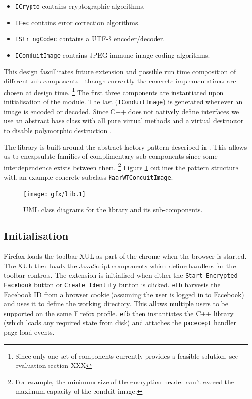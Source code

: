     \begin{itemize}
    
        \item {\tt ICrypto} contains cryptographic algorithms.
        \item {\tt IFec} contains error correction algorithms.
        \item {\tt IStringCodec} contains a UTF-8 encoder/decoder.
        \item {\tt IConduitImage} contains JPEG-immune image coding algorithms.
    
    \end{itemize}
    
    This design fascillitates future extension and possible run time composition of different sub-components - though currently the concrete implementations are chosen at design time. \footnote{Since only one set of components currently provides a feasible solution, see evaluation section XXX} The first three components are instantiated upon initialisation of the module. The last ({\tt IConduitImage}) is generated whenever an image is encoded or decoded. Since C++ does not natively define interfaces we use an abstract base class with all pure virtual methods and a virtual destructor to disable polymorphic destruction \cite{interfaces}. 
    
    The library is built around the abstract factory pattern described in \cite{dpatterns}. This allows us to encapsulate families of complimentary sub-components since some interdependence exists between them. \footnote{For example, the minimum size of the encryption header can't exceed the maximum capacity of the conduit image.} Figure \ref{uml:lib-classes} outlines the pattern structure with an example concrete subclass {\tt HaarWTConduitImage}.
    
    \begin{figure}[tb]
        \begin{center}
                \texttt{[image: gfx/lib.1]}
            \caption{UML class diagrams for the library and its sub-components.}
            \label{uml:lib-classes}
        \end{center}
    \end{figure}
    
\FloatBarrier    
\subsection{Initialisation}

Firefox loads the toolbar XUL as part of the chrome when the browser is started. The XUL then loads the JavaScript components which define handlers for the toolbar controls. The extension is initialised when either the {\tt Start Encrypted Facebook} button or {\tt Create Identity} button is clicked. {\tt efb} harvests the Facebook ID from a browser cookie (assuming the user is logged in to Facebook) and uses it to define the working directory. This allows multiple users to be supported on the same Firefox profile. {\tt efb} then instantiates the C++ library (which loads any required state from disk) and attaches the {\tt pacecept} handler page load events.

